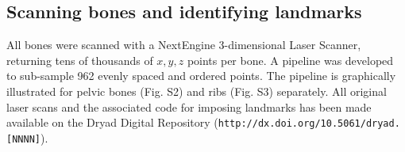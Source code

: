 \documentclass[12pt]{article}
\newcommand{\url}[1]{\texttt{#1}}
\begin{document}

\subsection*{Scanning bones and identifying landmarks}
All bones were scanned with a NextEngine 3-dimensional Laser Scanner, returning tens of thousands of $x,y,z$ points per bone.  A pipeline was developed to sub-sample 962 evenly spaced and ordered points.  The pipeline is graphically illustrated for pelvic bones (Fig. S2) and ribs (Fig. S3) separately.  All original laser scans and the associated code for imposing landmarks has been made available on the Dryad Digital Repository (\url{http://dx.doi.org/10.5061/dryad.[NNNN]}). 

\end{document}
